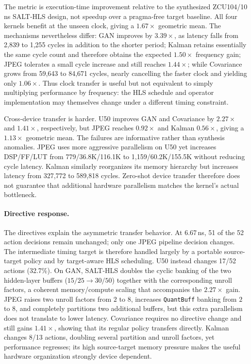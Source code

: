 The metric is execution-time improvement relative to the synthesized
ZCU104/10\,ns SALT-HLS design, not speedup over a pragma-free target
baseline. All four kernels benefit at the unseen clock, giving a
$1.67\times$ geometric mean. The mechanisms nevertheless differ:
GAN improves by $3.39\times$, as latency falls from 2,839 to 1,255 cycles
in addition to the shorter period; Kalman retains essentially the same
cycle count and therefore obtains the expected $1.50\times$ frequency
gain; JPEG tolerates a small cycle increase and still reaches
$1.44\times$; while Covariance grows from 59,643 to 84,671 cycles, nearly
cancelling the faster clock and yielding only $1.06\times$. Thus clock
transfer is useful but not equivalent to simply multiplying performance
by frequency: the HLS schedule and operator implementation may themselves
change under a different timing constraint.

Cross-device transfer is harder. U50 improves GAN and Covariance by
$2.27\times$ and $1.41\times$, respectively, but JPEG reaches
$0.92\times$ and Kalman $0.56\times$, giving a $1.13\times$ geometric
mean. The failures are informative rather than synthesis anomalies.
JPEG uses more aggressive parallelism on U50 yet increases DSP/FF/LUT
from 779/36.8K/116.1K to 1,159/60.2K/155.5K without reducing cycle
latency. Kalman similarly reorganizes its memory hierarchy but increases
latency from 327,772 to 589,818 cycles. Zero-shot device transfer
therefore does not guarantee that additional hardware parallelism matches
the kernel's actual bottleneck.


\paragraph{Directive response.}
The directives explain the asymmetric transfer behavior. At 6.67\,ns,
51 of the 52 action decisions remain unchanged; only one JPEG pipeline
decision changes. The intermediate timing target is therefore handled
largely by a portable source-target policy and by target-aware HLS
scheduling. U50 instead changes 17/52 actions (32.7\%). On GAN, SALT-HLS
doubles the cyclic banking of the two hidden-layer buffers
($15/25\!\rightarrow\!30/50$) together with the corresponding unroll
factors, a coherent memory/compute scaling that accompanies the
$2.27\times$ gain. JPEG raises two unroll factors from $2$ to $8$,
increases \texttt{QuantBuff} banking from $2$ to $8$, and completely
partitions two additional buffers, but this extra parallelism does not
translate to lower latency. Covariance requires no directive change and
still gains $1.41\times$, showing that its regular policy transfers
directly. Kalman changes 8/13 actions, doubling several partition and
unroll factors, yet performance regresses; its high source-target memory
pressure makes the useful hardware organization strongly device
dependent.

